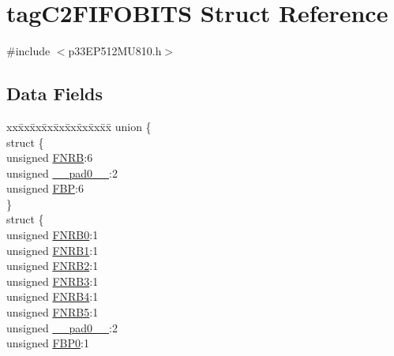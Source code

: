 \hypertarget{structtag_c2_f_i_f_o_b_i_t_s}{}\section{tag\+C2\+F\+I\+F\+O\+B\+I\+TS Struct Reference}
\label{structtag_c2_f_i_f_o_b_i_t_s}


{\ttfamily \#include $<$p33\+E\+P512\+M\+U810.\+h$>$}

\subsection*{Data Fields}
\begin{DoxyCompactItemize}
\item 
\begin{tabbing}
xx\=xx\=xx\=xx\=xx\=xx\=xx\=xx\=xx\=\kill
union \{\\
\>struct \{\\
\>\>unsigned \hyperlink{structtag_c2_f_i_f_o_b_i_t_s_a5133b0d0aae683d45a3af2028cc2bb4c}{FNRB}:6\\
\>\>unsigned \hyperlink{structtag_c2_f_i_f_o_b_i_t_s_adf71f3d8410c1f1dbbc96680a92c49af}{\_\_pad0\_\_}:2\\
\>\>unsigned \hyperlink{structtag_c2_f_i_f_o_b_i_t_s_a4bc01b2787e9b74bafc9a88e857924ff}{FBP}:6\\
\>\} \\
\>struct \{\\
\>\>unsigned \hyperlink{structtag_c2_f_i_f_o_b_i_t_s_ae66d44fcce0537281054f582268ccead}{FNRB0}:1\\
\>\>unsigned \hyperlink{structtag_c2_f_i_f_o_b_i_t_s_a115f782923b0fecb2a15a36397104ccb}{FNRB1}:1\\
\>\>unsigned \hyperlink{structtag_c2_f_i_f_o_b_i_t_s_a8bb0f7fb84c76708069eeb48a24a5d61}{FNRB2}:1\\
\>\>unsigned \hyperlink{structtag_c2_f_i_f_o_b_i_t_s_ab20b55838f7bd8b39c2c9b04de83ef34}{FNRB3}:1\\
\>\>unsigned \hyperlink{structtag_c2_f_i_f_o_b_i_t_s_a9095fcba1d93ad672ea64cf1cb2c0e71}{FNRB4}:1\\
\>\>unsigned \hyperlink{structtag_c2_f_i_f_o_b_i_t_s_a5397efb64ea26a685f138eeda891a3b6}{FNRB5}:1\\
\>\>unsigned \hyperlink{structtag_c2_f_i_f_o_b_i_t_s_adf71f3d8410c1f1dbbc96680a92c49af}{\_\_pad0\_\_}:2\\
\>\>unsigned \hyperlink{structtag_c2_f_i_f_o_b_i_t_s_a5e3a60193e141e6d442e85799299c1f5}{FBP0}:1\\

\end{tabbing}
\end{DoxyCompactItemize}
